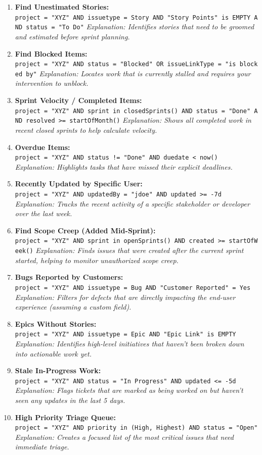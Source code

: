 \documentclass[
  11pt,
  openany,
  oneside]{book}
\begin{document}
\begin{enumerate}
\def\labelenumi{\arabic{enumi}.}
\item
  \textbf{Find Unestimated Stories:}
  \texttt{project\ =\ "XYZ"\ AND\ issuetype\ =\ Story\ AND\ "Story\ Points"\ is\ EMPTY\ AND\ status\ =\ "To\ Do"}
  \emph{Explanation: Identifies stories that need to be groomed and
  estimated before sprint planning.}
\item
  \textbf{Find Blocked Items:}
  \texttt{project\ =\ "XYZ"\ AND\ status\ =\ "Blocked"\ OR\ issueLinkType\ =\ "is\ blocked\ by"}
  \emph{Explanation: Locates work that is currently stalled and requires
  your intervention to unblock.}
\item
  \textbf{Sprint Velocity / Completed Items:}
  \texttt{project\ =\ "XYZ"\ AND\ sprint\ in\ closedSprints()\ AND\ status\ =\ "Done"\ AND\ resolved\ \textgreater{}=\ startOfMonth()}
  \emph{Explanation: Shows all completed work in recent closed sprints
  to help calculate velocity.}
\item
  \textbf{Overdue Items:}
  \texttt{project\ =\ "XYZ"\ AND\ status\ !=\ "Done"\ AND\ duedate\ \textless{}\ now()}
  \emph{Explanation: Highlights tasks that have missed their explicit
  deadlines.}
\item
  \textbf{Recently Updated by Specific User:}
  \texttt{project\ =\ "XYZ"\ AND\ updatedBy\ =\ "jdoe"\ AND\ updated\ \textgreater{}=\ -7d}
  \emph{Explanation: Tracks the recent activity of a specific
  stakeholder or developer over the last week.}
\item
  \textbf{Find Scope Creep (Added Mid-Sprint):}
  \texttt{project\ =\ "XYZ"\ AND\ sprint\ in\ openSprints()\ AND\ created\ \textgreater{}=\ startOfWeek()}
  \emph{Explanation: Finds issues that were created after the current
  sprint started, helping to monitor unauthorized scope creep.}
\item
  \textbf{Bugs Reported by Customers:}
  \texttt{project\ =\ "XYZ"\ AND\ issuetype\ =\ Bug\ AND\ "Customer\ Reported"\ =\ Yes}
  \emph{Explanation: Filters for defects that are directly impacting the
  end-user experience (assuming a custom field).}
\item
  \textbf{Epics Without Stories:}
  \texttt{project\ =\ "XYZ"\ AND\ issuetype\ =\ Epic\ AND\ "Epic\ Link"\ is\ EMPTY}
  \emph{Explanation: Identifies high-level initiatives that haven't been
  broken down into actionable work yet.}
\item
  \textbf{Stale In-Progress Work:}
  \texttt{project\ =\ "XYZ"\ AND\ status\ =\ "In\ Progress"\ AND\ updated\ \textless{}=\ -5d}
  \emph{Explanation: Flags tickets that are marked as being worked on
  but haven't seen any updates in the last 5 days.}
\item
  \textbf{High Priority Triage Queue:}
  \texttt{project\ =\ "XYZ"\ AND\ priority\ in\ (High,\ Highest)\ AND\ status\ =\ "Open"}
  \emph{Explanation: Creates a focused list of the most critical issues
  that need immediate triage.}
\end{enumerate}
\end{document}
